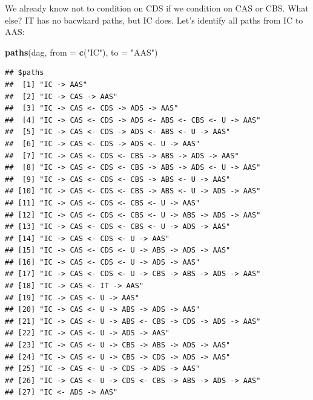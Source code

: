\documentclass[10pt,dvipsnames,enabledeprecatedfontcommands]{scrartcl}
\newenvironment{Shaded}{\begin{snugshade}}{\end{snugshade}}
\newcommand{\KeywordTok}[1]{\textcolor[rgb]{0.13,0.29,0.53}{\textbf{#1}}}
\newcommand{\DataTypeTok}[1]{\textcolor[rgb]{0.13,0.29,0.53}{#1}}
\newcommand{\StringTok}[1]{\textcolor[rgb]{0.31,0.60,0.02}{#1}}
\newcommand{\NormalTok}[1]{#1}
\begin{document}
We already know not to condition on CDS if we condition on CAS or CBS.
What else? \textsf{IT} has no bacwkard paths, but \textsf{IC} does.
Let's identify all paths from \textsf{IC} to \textsf{AAS}:

\vspace{1mm} \footnotesize

\begin{Shaded}
\begin{Highlighting}[]
\KeywordTok{paths}\NormalTok{(dag, }\DataTypeTok{from =} \KeywordTok{c}\NormalTok{(}\StringTok{"IC"}\NormalTok{), }\DataTypeTok{to =} \StringTok{"AAS"}\NormalTok{)}
\end{Highlighting}
\end{Shaded}

\begin{verbatim}
## $paths
##  [1] "IC -> AAS"                                              
##  [2] "IC -> CAS -> AAS"                                       
##  [3] "IC -> CAS <- CDS -> ADS -> AAS"                         
##  [4] "IC -> CAS <- CDS -> ADS <- ABS <- CBS <- U -> AAS"      
##  [5] "IC -> CAS <- CDS -> ADS <- ABS <- U -> AAS"             
##  [6] "IC -> CAS <- CDS -> ADS <- U -> AAS"                    
##  [7] "IC -> CAS <- CDS <- CBS -> ABS -> ADS -> AAS"           
##  [8] "IC -> CAS <- CDS <- CBS -> ABS -> ADS <- U -> AAS"      
##  [9] "IC -> CAS <- CDS <- CBS -> ABS <- U -> AAS"             
## [10] "IC -> CAS <- CDS <- CBS -> ABS <- U -> ADS -> AAS"      
## [11] "IC -> CAS <- CDS <- CBS <- U -> AAS"                    
## [12] "IC -> CAS <- CDS <- CBS <- U -> ABS -> ADS -> AAS"      
## [13] "IC -> CAS <- CDS <- CBS <- U -> ADS -> AAS"             
## [14] "IC -> CAS <- CDS <- U -> AAS"                           
## [15] "IC -> CAS <- CDS <- U -> ABS -> ADS -> AAS"             
## [16] "IC -> CAS <- CDS <- U -> ADS -> AAS"                    
## [17] "IC -> CAS <- CDS <- U -> CBS -> ABS -> ADS -> AAS"      
## [18] "IC -> CAS <- IT -> AAS"                                 
## [19] "IC -> CAS <- U -> AAS"                                  
## [20] "IC -> CAS <- U -> ABS -> ADS -> AAS"                    
## [21] "IC -> CAS <- U -> ABS <- CBS -> CDS -> ADS -> AAS"      
## [22] "IC -> CAS <- U -> ADS -> AAS"                           
## [23] "IC -> CAS <- U -> CBS -> ABS -> ADS -> AAS"             
## [24] "IC -> CAS <- U -> CBS -> CDS -> ADS -> AAS"             
## [25] "IC -> CAS <- U -> CDS -> ADS -> AAS"                    
## [26] "IC -> CAS <- U -> CDS <- CBS -> ABS -> ADS -> AAS"      
## [27] "IC <- ADS -> AAS"                                       

\end{verbatim}
\end{document}
